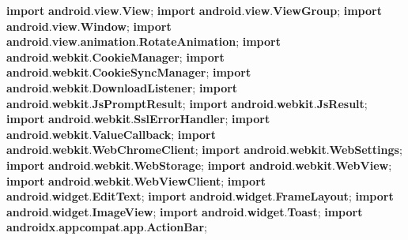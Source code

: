 \documentclass[
]{article}
\newenvironment{Shaded}{}{}
\newcommand{\ImportTok}[1]{\textcolor[rgb]{0.00,0.50,0.00}{\textbf{#1}}}
\newcommand{\KeywordTok}[1]{\textcolor[rgb]{0.00,0.44,0.13}{\textbf{#1}}}
\newcommand{\OperatorTok}[1]{\textcolor[rgb]{0.40,0.40,0.40}{#1}}
\begin{document}
\begin{Shaded}
\begin{Highlighting}[]
\KeywordTok{import} \ImportTok{android}\OperatorTok{.}\ImportTok{view}\OperatorTok{.}\ImportTok{View}\OperatorTok{;}
\KeywordTok{import} \ImportTok{android}\OperatorTok{.}\ImportTok{view}\OperatorTok{.}\ImportTok{ViewGroup}\OperatorTok{;}
\KeywordTok{import} \ImportTok{android}\OperatorTok{.}\ImportTok{view}\OperatorTok{.}\ImportTok{Window}\OperatorTok{;}
\KeywordTok{import} \ImportTok{android}\OperatorTok{.}\ImportTok{view}\OperatorTok{.}\ImportTok{animation}\OperatorTok{.}\ImportTok{RotateAnimation}\OperatorTok{;}
\KeywordTok{import} \ImportTok{android}\OperatorTok{.}\ImportTok{webkit}\OperatorTok{.}\ImportTok{CookieManager}\OperatorTok{;}
\KeywordTok{import} \ImportTok{android}\OperatorTok{.}\ImportTok{webkit}\OperatorTok{.}\ImportTok{CookieSyncManager}\OperatorTok{;}
\KeywordTok{import} \ImportTok{android}\OperatorTok{.}\ImportTok{webkit}\OperatorTok{.}\ImportTok{DownloadListener}\OperatorTok{;}
\KeywordTok{import} \ImportTok{android}\OperatorTok{.}\ImportTok{webkit}\OperatorTok{.}\ImportTok{JsPromptResult}\OperatorTok{;}
\KeywordTok{import} \ImportTok{android}\OperatorTok{.}\ImportTok{webkit}\OperatorTok{.}\ImportTok{JsResult}\OperatorTok{;}
\KeywordTok{import} \ImportTok{android}\OperatorTok{.}\ImportTok{webkit}\OperatorTok{.}\ImportTok{SslErrorHandler}\OperatorTok{;}
\KeywordTok{import} \ImportTok{android}\OperatorTok{.}\ImportTok{webkit}\OperatorTok{.}\ImportTok{ValueCallback}\OperatorTok{;}
\KeywordTok{import} \ImportTok{android}\OperatorTok{.}\ImportTok{webkit}\OperatorTok{.}\ImportTok{WebChromeClient}\OperatorTok{;}
\KeywordTok{import} \ImportTok{android}\OperatorTok{.}\ImportTok{webkit}\OperatorTok{.}\ImportTok{WebSettings}\OperatorTok{;}
\KeywordTok{import} \ImportTok{android}\OperatorTok{.}\ImportTok{webkit}\OperatorTok{.}\ImportTok{WebStorage}\OperatorTok{;}
\KeywordTok{import} \ImportTok{android}\OperatorTok{.}\ImportTok{webkit}\OperatorTok{.}\ImportTok{WebView}\OperatorTok{;}
\KeywordTok{import} \ImportTok{android}\OperatorTok{.}\ImportTok{webkit}\OperatorTok{.}\ImportTok{WebViewClient}\OperatorTok{;}
\KeywordTok{import} \ImportTok{android}\OperatorTok{.}\ImportTok{widget}\OperatorTok{.}\ImportTok{EditText}\OperatorTok{;}
\KeywordTok{import} \ImportTok{android}\OperatorTok{.}\ImportTok{widget}\OperatorTok{.}\ImportTok{FrameLayout}\OperatorTok{;}
\KeywordTok{import} \ImportTok{android}\OperatorTok{.}\ImportTok{widget}\OperatorTok{.}\ImportTok{ImageView}\OperatorTok{;}
\KeywordTok{import} \ImportTok{android}\OperatorTok{.}\ImportTok{widget}\OperatorTok{.}\ImportTok{Toast}\OperatorTok{;}
\KeywordTok{import} \ImportTok{androidx}\OperatorTok{.}\ImportTok{appcompat}\OperatorTok{.}\ImportTok{app}\OperatorTok{.}\ImportTok{ActionBar}\OperatorTok{;}

\end{Highlighting}
\end{Shaded}
\end{document}
